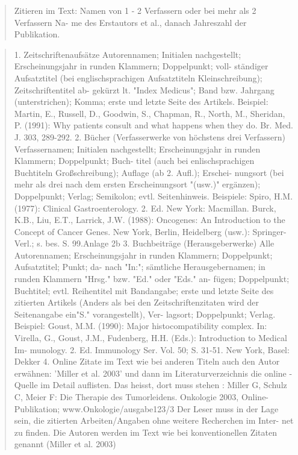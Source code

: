 \documentclass{article}
\begin{document}
\begin{quote}
Zitieren im Text: Namen von 1 - 2 Verfassern oder bei mehr als 2 Verfassern Na-
me des Erstautors et al., danach Jahreszahl der Publikation.
\end{quote}

\begin{quote}
	1. Zeitschriftenaufsätze
Autorennamen; Initialen nachgestellt; Erscheinungsjahr in runden Klammern; Doppelpunkt; voll-
ständiger Aufsatztitel (bei englischsprachigen Aufsatztiteln Kleinschreibung); Zeitschriftentitel ab-
gekürzt lt. "Index Medicus"; Band bzw. Jahrgang (unterstrichen); Komma; erste und letzte Seite des
Artikels.
Beispiel: Martin, E., Russell, D., Goodwin, S., Chapman, R.,
North, M., Sheridan, P. (1991):
Why patients consult and what happens when they do.
Br. Med. J. 303, 289-292.
2. Bücher (Verfasserwerke von höchstens drei Verfassern)
Verfassernamen; Initialen nachgestellt; Erscheinungsjahr in runden Klammern; Doppelpunkt; Buch-
titel (auch bei enlischsprachigen Buchtiteln Großschreibung); Auflage (ab 2. Aufl.); Erschei-
nungsort (bei mehr als drei nach dem ersten Erscheinungsort "(usw.)" ergänzen); Doppelpunkt;
Verlag; Semikolon; evtl. Seitenhinweis.
Beispiele: Spiro, H.M. (1977):
Clinical Gastroenterology. 2. Ed.
New York: Macmillan.
Burck, K.B., Liu, E.T., Larrick, J.W. (1988):
Oncogenes: An Introduction to the Concept of Cancer
Genes. New York, Berlin, Heidelberg (usw.):
Springer-Verl.; s. bes. S. 99.Anlage 2b
3. Buchbeiträge (Herausgeberwerke)
Alle Autorennamen; Erscheinungsjahr in runden Klammern; Doppelpunkt; Aufsatztitel; Punkt; da-
nach "In:"; sämtliche Herausgebernamen; in runden Klammern "Hrsg." bzw. "Ed." oder "Eds." an-
fügen; Doppelpunkt; Buchtitel; evtl. Reihentitel mit Bandangabe; erste und letzte Seite des zitierten
Artikels (Anders als bei den Zeitschriftenzitaten wird der Seitenangabe ein"S." vorangestellt), Ver-
lagsort; Doppelpunkt; Verlag.
Beispiel: Goust, M.M. (1990): Major histocompatibility complex.
In: Virella, G., Goust, J.M., Fudenberg, H.H. (Eds.): Introduction to Medical Im-
munology.
2. Ed. Immunology Ser. Vol. 50; S. 31-51. New York,
Basel: Dekker
4. Online Zitate
im Text wie bei anderen Titeln auch den Autor erwähnen:
'Miller et al. 2003' und dann im Literaturverzeichnis die online - Quelle
im Detail auflisten. Das heisst, dort muss stehen :
Miller G, Schulz C, Meier F: Die Therapie des Tumorleidens. Onkologie 2003,
Online-Publikation; www.Onkologie/ausgabe123/3
Der Leser muss in der Lage sein, die zitierten Arbeiten/Angaben ohne weitere Recherchen im Inter-
net zu finden. Die Autoren werden im Text wie bei konventionellen Zitaten genannt (Miller et al.
2003)
\end{quote}

\printbibliography
\end{document}
